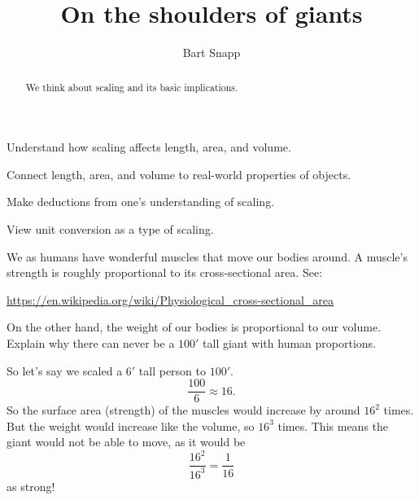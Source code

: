 \documentclass[,nooutcomes,noauthor,hints,12pt,handout]{ximera}
\title{On the shoulders of giants}
\author{Bart Snapp}
\begin{document}
\begin{abstract}
  We think about scaling and its basic implications.
\end{abstract}
\maketitle

\begin{listOutcomes}
\item Understand how scaling affects length, area, and volume.
\item Connect length, area, and volume to real-world properties of objects.
\item Make deductions from one's understanding of scaling.
\item View unit conversion as a type of scaling.
\end{listOutcomes}

\mynewpage
\begin{question}
  We as humans have wonderful muscles that move our bodies
  around. A muscle's strength is roughly proportional to
  its cross-sectional area. See:
  \begin{center}
    \url{https://en.wikipedia.org/wiki/Physiological_cross-sectional_area}
  \end{center}
  On the other hand, the weight of our bodies is proportional to our
  volume. Explain why there can never be a $100'$ tall giant with human proportions.
  \begin{freeResponse}
    So let's say we scaled a $6'$ tall person to $100'$.
    \[
    \frac{100}{6}\approx 16.
    \]
    So the surface area (strength) of the muscles would increase by
    around $16^2$ times. But the weight would increase like the volume, so $16^3$ times.
    This means the giant would not be able to move, as it would be
    \[
    \frac{16^2}{16^3} = \frac{1}{16}
    \]
    as strong!
  \end{freeResponse}
\end{question}
\mynewpage
\end{document}
